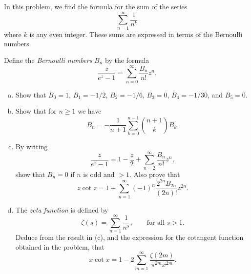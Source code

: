 \begin{pb}[4]
    In this problem, we find the formula for the sum of the series
    \begin{equation*}
        \sum_{n = 1}^{\infty} \frac{1}{n^k}
    \end{equation*}
    where \(k\) is any even integer.
    These sums are expressed in terms of the Bernoulli numbers.

    Define the \emph{Bernoulli numbers} \(B_n\) by the formula
    \begin{equation*}
        \frac{z}{e^z - 1} = \sum_{n = 0}^{\infty} \frac{B_n}{n!} z^n.
    \end{equation*}
    \begin{enumerate}[(a)]
    \item
        Show that \(B_0 = 1\), \(B_1 = - 1 / 2\), \(B_2 = -1 / 6\),
        \(B_3 = 0\), \(B_4 = -1 / 30\), and \(B_5 = 0\).
    
    \item
        Show that for \(n \geq 1\) we have
        \begin{equation*}
            B_n = - \frac{1}{n + 1} \sum_{k = 0}^{n - 1}  \binom{n + 1}{k} B_k.
        \end{equation*}
    
    \item
        By writing
        \begin{equation*}
            \frac{z}{e^z - 1} = 1 - \frac{z}{2} + \sum_{n = 2}^{\infty} \frac{B_n}{n!}z^n,
        \end{equation*}
        show that \(B_n = 0\) if \(n\) is odd and \(> 1\).
        Also prove that
        \begin{equation*}
            z \cot z = 1 + \sum_{n = 1}^{\infty} (-1)^n \frac{2^{2n} B_{2n}}{(2n)!} z^{2n}.
        \end{equation*}
    
    \item
        The \emph{zeta function} is defined by
        \begin{equation*}
            \zeta(s) = \sum_{n = 1}^{\infty}  \frac{1}{n^s}, \quad \quad \text{for all \(s > 1\)}.
        \end{equation*}
        Deduce from the result in (c), and the expression for the cotangent function
        obtained in the problem, that
        \begin{equation*}
            x \cot x = 1 - 2 \sum_{m = 1}^{\infty} \frac{\zeta(2m)}{\pi^{2m}x^{2m}}.
        \end{equation*}
    

\end{enumerate}
\end{pb}
